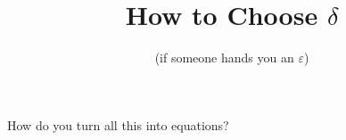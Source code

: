 \documentclass{slides}
\title{How to Choose $ \delta$}
\author{(if someone hands you an $ \varepsilon$)}
\begin{document}
\maketitle

\begin{slide}

\end{slide}

\begin{slide}

\end{slide}

\begin{slide}

\end{slide}

\begin{slide}
How do you turn all this into equations?
\end{slide}
\end{document}
